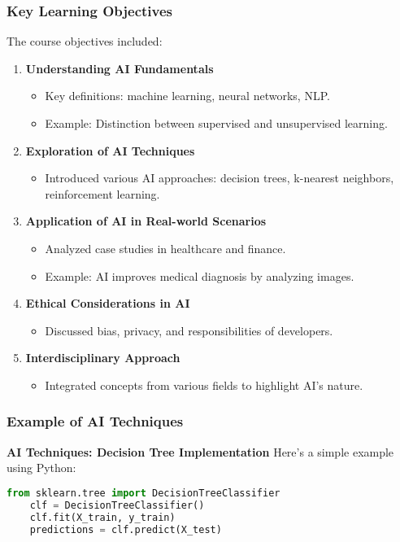 \documentclass[aspectratio=169]{beamer}
\begin{document}
\begin{frame}[fragile]
    \frametitle{Key Learning Objectives}
    The course objectives included:
    \begin{enumerate}
        \item \textbf{Understanding AI Fundamentals}
            \begin{itemize}
                \item Key definitions: machine learning, neural networks, NLP.
                \item Example: Distinction between supervised and unsupervised learning.
            \end{itemize}
        \item \textbf{Exploration of AI Techniques}
            \begin{itemize}
                \item Introduced various AI approaches: decision trees, k-nearest neighbors, reinforcement learning.
            \end{itemize}
        \item \textbf{Application of AI in Real-world Scenarios}
            \begin{itemize}
                \item Analyzed case studies in healthcare and finance.
                \item Example: AI improves medical diagnosis by analyzing images.
            \end{itemize}
        \item \textbf{Ethical Considerations in AI}
            \begin{itemize}
                \item Discussed bias, privacy, and responsibilities of developers.
            \end{itemize}
        \item \textbf{Interdisciplinary Approach}
            \begin{itemize}
                \item Integrated concepts from various fields to highlight AI's nature.
            \end{itemize}
    \end{enumerate}
\end{frame}

\begin{frame}[fragile]
    \frametitle{Example of AI Techniques}
    \textbf{AI Techniques: Decision Tree Implementation}
    Here’s a simple example using Python:

    \begin{lstlisting}[language=Python]
    from sklearn.tree import DecisionTreeClassifier
    clf = DecisionTreeClassifier()
    clf.fit(X_train, y_train)
    predictions = clf.predict(X_test)
    \end{lstlisting}
\end{frame}
\end{document}
